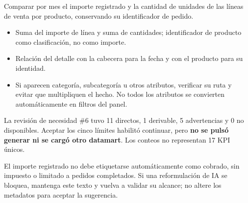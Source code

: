\label{aw02}
\begin{goal}
Comparar por mes el importe registrado y la cantidad de unidades de las líneas de venta por producto, conservando su identificador de pedido.
\end{goal}
\begin{itemize}
\item Suma del importe de línea y suma de cantidades; identificador de producto como clasificación, no como importe.
\item Relación del detalle con la cabecera para la fecha y con el producto para su identidad.
\item Si aparecen categoría, subcategoría u otros atributos, verificar su ruta y evitar que multipliquen el hecho. No todos los atributos se convierten automáticamente en filtros del panel.
\end{itemize}
\begin{good}
La revisión de necesidad \#6 tuvo 11 directos, 1 derivable, 5 advertencias y 0 no disponibles. Aceptar los cinco límites habilitó continuar, pero \textbf{no se pulsó generar ni se cargó otro datamart}. Los conteos no representan 17 KPI únicos.
\end{good}
\begin{note}
El importe registrado no debe etiquetarse automáticamente como cobrado, sin impuesto o limitado a pedidos completados. Si una reformulación de IA se bloquea, mantenga este texto y vuelva a validar su alcance; no altere los metadatos para aceptar la sugerencia.
\end{note}

